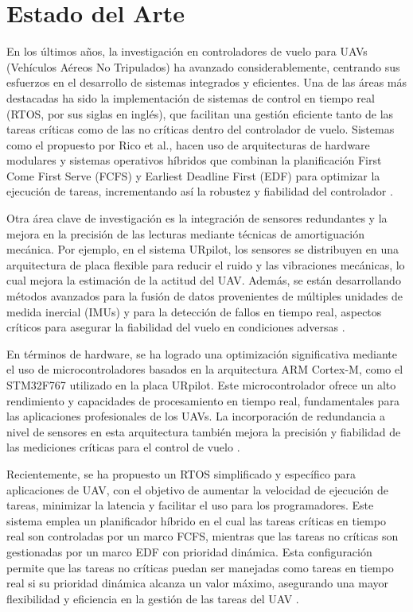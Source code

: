 
\section{Estado del Arte}

En los últimos años, la investigación en controladores de vuelo para UAVs (Vehículos Aéreos No Tripulados) ha avanzado considerablemente, centrando sus esfuerzos en el desarrollo de sistemas integrados y eficientes. Una de las áreas más destacadas ha sido la implementación de sistemas de control en tiempo real (RTOS, por sus siglas en inglés), que facilitan una gestión eficiente tanto de las tareas críticas como de las no críticas dentro del controlador de vuelo. Sistemas como el propuesto por Rico et al., hacen uso de arquitecturas de hardware modulares y sistemas operativos híbridos que combinan la planificación First Come First Serve (FCFS) y Earliest Deadline First (EDF) para optimizar la ejecución de tareas, incrementando así la robustez y fiabilidad del controlador \cite{paper} \cite{rtos}.

Otra área clave de investigación es la integración de sensores redundantes y la mejora en la precisión de las lecturas mediante técnicas de amortiguación mecánica. Por ejemplo, en el sistema URpilot, los sensores se distribuyen en una arquitectura de placa flexible para reducir el ruido y las vibraciones mecánicas, lo cual mejora la estimación de la actitud del UAV. Además, se están desarrollando métodos avanzados para la fusión de datos provenientes de múltiples unidades de medida inercial (IMUs) y para la detección de fallos en tiempo real, aspectos críticos para asegurar la fiabilidad del vuelo en condiciones adversas \cite{rtos}.

En términos de hardware, se ha logrado una optimización significativa mediante el uso de microcontroladores basados en la arquitectura ARM Cortex-M, como el STM32F767 utilizado en la placa URpilot. Este microcontrolador ofrece un alto rendimiento y capacidades de procesamiento en tiempo real, fundamentales para las aplicaciones profesionales de los UAVs. La incorporación de redundancia a nivel de sensores en esta arquitectura también mejora la precisión y fiabilidad de las mediciones críticas para el control de vuelo \cite{rtos}.

Recientemente, se ha propuesto un RTOS simplificado y específico para aplicaciones de UAV, con el objetivo de aumentar la velocidad de ejecución de tareas, minimizar la latencia y facilitar el uso para los programadores. Este sistema emplea un planificador híbrido en el cual las tareas críticas en tiempo real son controladas por un marco FCFS, mientras que las tareas no críticas son gestionadas por un marco EDF con prioridad dinámica. Esta configuración permite que las tareas no críticas puedan ser manejadas como tareas en tiempo real si su prioridad dinámica alcanza un valor máximo, asegurando una mayor flexibilidad y eficiencia en la gestión de las tareas del UAV \cite{rtos}.\\